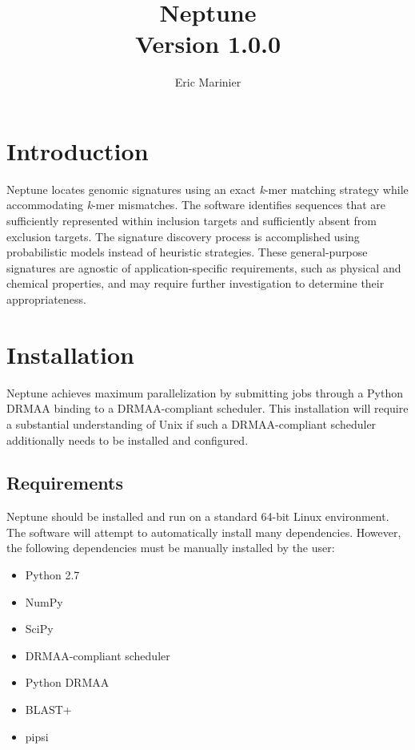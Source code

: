 \documentclass[a4paper,10pt]{article}
\title{Neptune \\ \normalsize Version 1.0.0}
\author{Eric Marinier}
\begin{document}
\maketitle

\newpage
\tableofcontents

\newpage
\section{Introduction}

Neptune locates genomic signatures using an exact \textit{k}-mer matching strategy while accommodating \textit{k}-mer mismatches. The software identifies sequences that are sufficiently represented within inclusion targets and sufficiently absent from exclusion targets. The signature discovery process is accomplished using probabilistic models instead of heuristic strategies. These general-purpose signatures are agnostic of application-specific requirements, such as physical and chemical properties, and may require further investigation to determine their appropriateness.

\newpage
\section{Installation}

Neptune achieves maximum parallelization by submitting jobs through a Python DRMAA binding to a DRMAA-compliant scheduler. This installation will require a substantial understanding of Unix if such a DRMAA-compliant scheduler additionally needs to be installed and configured.

\subsection{Requirements}

Neptune should be installed and run on a standard 64-bit Linux environment. The software will attempt to automatically install many dependencies. However, the following dependencies must be manually installed by the user:

\begin{itemize}
  \item Python 2.7
  \item NumPy
  \item SciPy
  \item DRMAA-compliant scheduler
  \item Python DRMAA
  \item BLAST+
  \item pipsi
\end{itemize}
\end{document}

